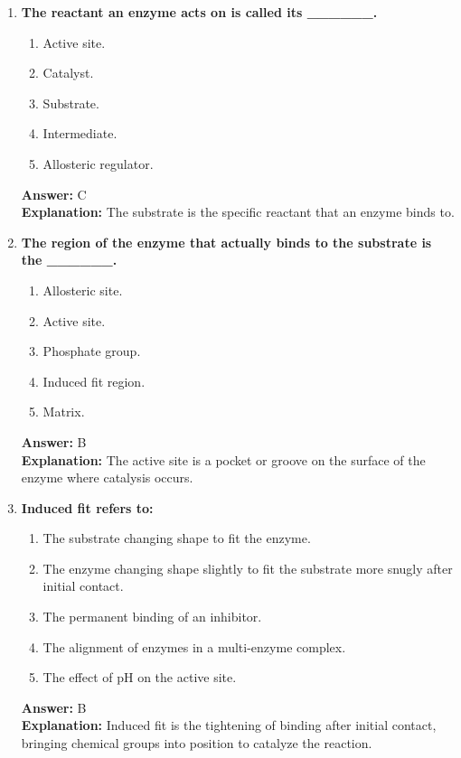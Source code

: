 \documentclass[11pt, a4paper]{article}
\begin{document}
\begin{enumerate}[leftmargin=*, label=\arabic*.]
\item \textbf{The reactant an enzyme acts on is called its \_\_\_\_\_\_.}
\begin{enumerate}[label=\Alph*.]
    \item Active site.
    \item Catalyst.
    \item Substrate.
    \item Intermediate.
    \item Allosteric regulator.
\end{enumerate}
\textbf{Answer:} C \\
\textbf{Explanation:} The substrate is the specific reactant that an enzyme binds to.

\item \textbf{The region of the enzyme that actually binds to the substrate is the \_\_\_\_\_\_.}
\begin{enumerate}[label=\Alph*.]
    \item Allosteric site.
    \item Active site.
    \item Phosphate group.
    \item Induced fit region.
    \item Matrix.
\end{enumerate}
\textbf{Answer:} B \\
\textbf{Explanation:} The active site is a pocket or groove on the surface of the enzyme where catalysis occurs.

\item \textbf{Induced fit refers to:}
\begin{enumerate}[label=\Alph*.]
    \item The substrate changing shape to fit the enzyme.
    \item The enzyme changing shape slightly to fit the substrate more snugly after initial contact.
    \item The permanent binding of an inhibitor.
    \item The alignment of enzymes in a multi-enzyme complex.
    \item The effect of pH on the active site.
\end{enumerate}
\textbf{Answer:} B \\
\textbf{Explanation:} Induced fit is the tightening of binding after initial contact, bringing chemical groups into position to catalyze the reaction.


\end{enumerate}
\end{document}
